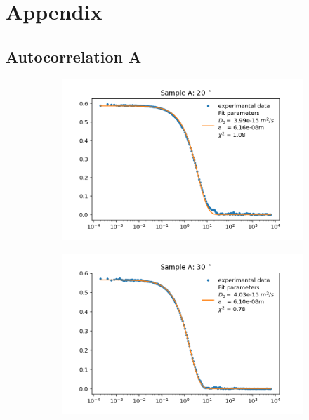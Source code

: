 \documentclass[]{article}
\begin{document}
\newpage
\section{Appendix}

\subsection{Autocorrelation A}
\label{autocorr A}
\begin{figure}[!h]
\centering

\begin{subfigure}{0.48\textwidth}
\includegraphics[width=\linewidth]{Plots/A/20.png}
\end{subfigure}
\begin{subfigure}[c]{0.48\linewidth}
\includegraphics[width=\linewidth]{Plots/A/30.png}
\end{subfigure}


\end{figure}
\end{document}
